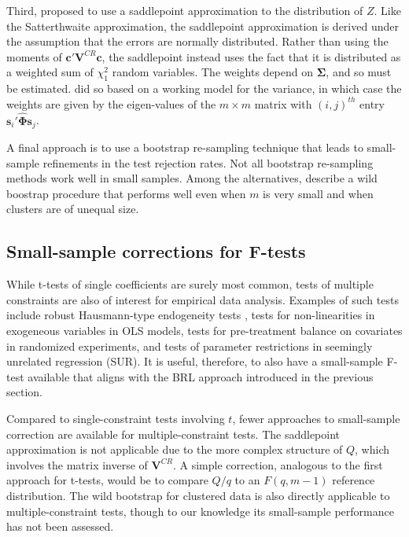 \documentclass[12pt]{article}\usepackage[]{graphicx}\usepackage[]{color}
\newcommand{\bm}{\mathbf}
\newcommand{\bs}{\boldsymbol}
\begin{document}
Third, \citet{McCaffrey2006improved} proposed to use a saddlepoint approximation to the distribution of $Z$. 
Like the Satterthwaite approximation, the saddlepoint approximation is derived under the assumption that the errors are normally distributed. 
Rather than using the moments of $\bm{c}'\bm{V}^{CR}\bm{c}$, the saddlepoint instead uses the fact that it is distributed as a weighted sum of $\chi^2_1$ random variables. 
The weights depend on $\bs\Sigma$, and so must be estimated. \citet{McCaffrey2006improved} did so based on a working model for the variance, in which case the weights are given by the eigen-values of the $m \times m$ matrix with $(i,j)^{th}$ entry $\bm{s}_i'\hat{\bs\Phi} \bm{s}_j$. 

A final approach is to use a bootstrap re-sampling technique that leads to small-sample refinements in the test rejection rates. 
Not all bootstrap re-sampling methods work well in small samples. 
Among the alternatives, \citet{Webb2013wild} describe a wild boostrap procedure that performs well even when $m$ is very small and when clusters are of unequal size.

\subsection{Small-sample corrections for F-tests}

While t-tests of single coefficients are surely most common, tests of multiple constraints are also of interest for empirical data analysis. Examples of such tests include robust Hausmann-type endogeneity tests \citep{Arellano1993on}, tests for non-linearities in exogeneous variables in OLS models, tests for pre-treatment balance on covariates in randomized experiments, and tests of parameter restrictions in seemingly unrelated regression (SUR). It is useful, therefore, to also have a small-sample F-test available that aligns with the BRL approach introduced in the previous section.

Compared to single-constraint tests involving $t$, fewer approaches to small-sample correction are available for multiple-constraint tests. 
The saddlepoint approximation is not applicable due to the more complex structure of $Q$, which involves the matrix inverse of $\bm{V}^{CR}$. 
A simple correction, analogous to the first approach for t-tests, would be to compare $Q / q$ to an $F(q, m - 1)$ reference distribution. 
The wild bootstrap for clustered data \citep{Webb2013wild} is also directly applicable to multiple-constraint tests, though to our knowledge its small-sample performance has not been assessed. 
\end{document}
